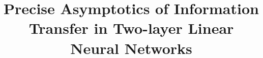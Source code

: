 \documentclass{article}
\newcommand*\samethanks[1][\value{footnote}]{\footnotemark[#1]}
\begin{document}
	\title{Precise Asymptotics of Information Transfer in Two-layer Linear Neural Networks}
	\iffalse
	\vspace{0.15in}
	\author[1]{Hongyang R. Zhang\thanks{HZ and FY contributed equally to the theoretical results. SW conducted the experimental analysis. Correspondence to hrzhang@northeastern.edu or fyang75@wharton.upenn.edu.}}
	\author[2]{Fan Yang\samethanks}
	\author[3]{Sen Wu\samethanks}
	\author[2]{Weijie J. Su}
	\author[3]{Christopher R\'e}
	\vspace{0.15in}
	\affil[1]{Khoury College of Computer Sciences, Northeastern University}
	\affil[2]{Department of Statistics, The Wharton School, University of Pennsylvania}
	\affil[3]{Department of Computer Science, Stanford University}
	\fi

	\maketitle
	
	
	
	
	
	
	
	
\end{document}
